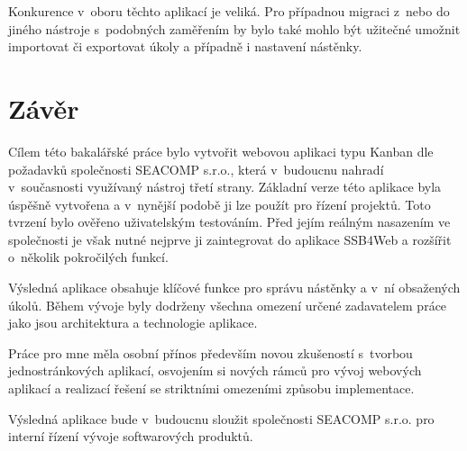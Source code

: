Konkurence v~oboru těchto aplikací je veliká. Pro případnou migraci z~nebo do jiného nástroje s~podobných zaměřením by bylo také mohlo být užitečné umožnit importovat či exportovat úkoly a případně i nastavení nástěnky.




\chapter{Závěr}
Cílem této bakalářské práce bylo vytvořit webovou aplikaci typu Kanban dle požadavků společnosti SEACOMP s.r.o., která v~budoucnu nahradí v~současnosti využívaný nástroj třetí strany. Základní verze této aplikace byla úspěšně vytvořena a v~nynější podobě ji lze použít pro řízení projektů. Toto tvrzení bylo ověřeno uživatelským testováním. Před jejím reálným nasazením ve společnosti je však nutné nejprve ji zaintegrovat do aplikace SSB4Web a rozšířit o~několik pokročilých funkcí.

Výsledná aplikace obsahuje klíčové funkce pro správu nástěnky a v~ní obsažených úkolů. Během vývoje byly dodrženy všechna omezení určené zadavatelem práce jako jsou architektura a technologie aplikace.

Práce pro mne měla osobní přínos především novou zkušeností s~tvorbou jednostránkových aplikací, osvojením si nových rámců pro vývoj webových aplikací a realizací řešení se striktními omezeními způsobu implementace.

Výsledná aplikace bude v~budoucnu sloužit společnosti SEACOMP s.r.o. pro interní řízení vývoje softwarových produktů.
